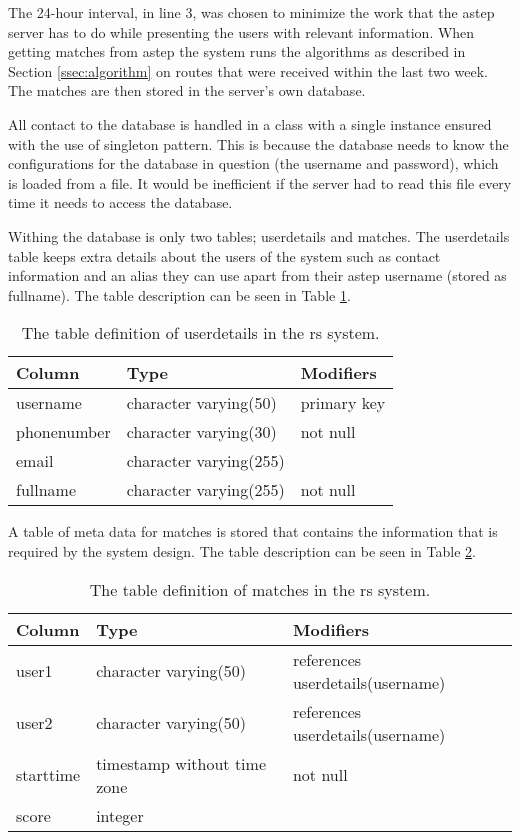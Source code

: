 The 24-hour interval, in line 3, was chosen to minimize the work that the \gls{astep} server has to do while presenting the users with relevant information.
When getting matches from \gls{astep} the system runs the algorithms as described in Section \ref{ssec:algorithm} on routes that were received within the last two week.
The matches are then stored in the server's own database.

All contact to the database is handled in a class with a single instance ensured with the use of singleton pattern. 
This is because the database needs to know the configurations for the database in question (the username and password), which is loaded from a file.
It would be inefficient if the server had to read this file every time it needs to access the database.

Withing the database is only two tables; userdetails and matches.
The userdetails table keeps extra details about the users of the system such as contact information and an alias they can use apart from their \gls{astep} username (stored as fullname).
The table description can be seen in Table \ref{tab:userdetails}.

\begin{table}[h]
	\centering
	\begin{tabular}{l|l|l}
		Column 		& Type                   & Modifiers\\\hline
		username    & character varying(50)  & primary key\\
		phonenumber & character varying(30)  & not null\\
		email       & character varying(255) &\\
		fullname    & character varying(255) & not null\\
	\end{tabular}
	\caption{The table definition of userdetails in the \gls{rs} system.}
	\label{tab:userdetails}
\end{table}

A table of meta data for matches is stored that contains the information that is required by the system design.
The table description can be seen in Table \ref{tab:matches}.

\begin{table}[h]
	\centering
	\begin{tabular}{l|l|l}
			   Column  &            Type             & Modifiers\\\hline
			 user1     & character varying(50)       & references userdetails(username)\\
			 user2     & character varying(50)       & references userdetails(username)\\
			 starttime & timestamp without time zone & not null\\
			 score     & integer                     &
	\end{tabular}
	\caption{The table definition of matches in the \gls{rs} system.}
	\label{tab:matches}
\end{table}
